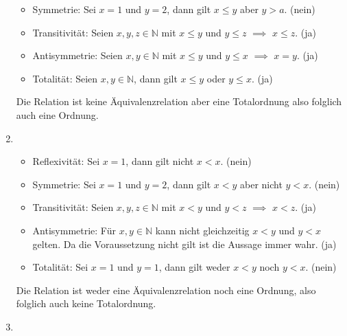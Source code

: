 \documentclass[german,12pt]{homework}
\newcommand{\NN}{\mathbb{N}}
\begin{document}
\begin{enumerate}
\begin{itemize}
    		\item Symmetrie: Sei \(x = 1\) und \(y = 2\), dann gilt \(x \le y\)
            aber \(y > a\). (nein)
    		\item Transitivität: Seien \(x, y, z \in \NN\) mit \(x \le y\) und
            \(y \le z\) \(\implies\) \(x \le z\). (ja)
    		\item Antisymmetrie: Seien \(x, y \in \NN\) mit \(x \le y\) und \(y
            \le x\) \(\implies\) \(x = y\). (ja)
    		\item Totalität: Seien \(x, y \in \NN\), dann gilt \(x \le y\) oder
            \(y \le x\). (ja)
    	\end{itemize}
    	Die Relation ist keine Äquivalenzrelation aber eine Totalordnung also
        folglich auch eine Ordnung.
        \item\ \\
        \begin{itemize}
    		\item Reflexivität: Sei \(x = 1\), dann gilt nicht \(x < x\). (nein)
    		\item Symmetrie: Sei \(x = 1\) und \(y = 2\), dann gilt \(x < y\)
            aber nicht \(y < x\). (nein)
    		\item Transitivität: Seien \(x, y, z \in \NN\) mit \(x < y\) und
            \(y < z\) \(\implies\) \(x < z\). (ja)
    		\item Antisymmetrie: Für \(x, y \in \NN\) kann nicht gleichzeitig
            \(x < y\) und \(y < x\) gelten. Da die Voraussetzung nicht gilt ist
            die Aussage immer wahr. (ja)
    		\item Totalität: Sei \(x = 1\) und \(y = 1\), dann gilt weder \(x <
            y\) noch \(y < x\). (nein)
    	\end{itemize}
    	Die Relation ist weder eine Äquivalenzrelation noch eine Ordnung, also
        folglich auch keine Totalordnung.
        \item\ \\
\end{enumerate}
\end{document}
